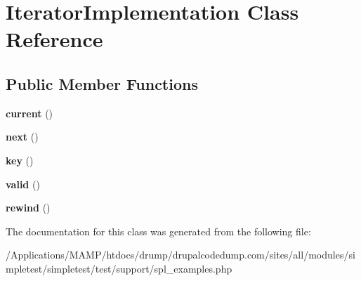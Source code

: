 \hypertarget{class_iterator_implementation}{
\section{IteratorImplementation Class Reference}
\label{class_iterator_implementation}
}
\subsection*{Public Member Functions}
\begin{DoxyCompactItemize}
\item 
\hypertarget{class_iterator_implementation_af3f0ad66ea4a7aa12425f0b9ac02f8a0}{
{\bfseries current} ()}
\label{class_iterator_implementation_af3f0ad66ea4a7aa12425f0b9ac02f8a0}

\item 
\hypertarget{class_iterator_implementation_afeecb34de372f06263606173e9fce558}{
{\bfseries next} ()}
\label{class_iterator_implementation_afeecb34de372f06263606173e9fce558}

\item 
\hypertarget{class_iterator_implementation_a43a7b3b6433284a120011140b2e0605d}{
{\bfseries key} ()}
\label{class_iterator_implementation_a43a7b3b6433284a120011140b2e0605d}

\item 
\hypertarget{class_iterator_implementation_a18282275d174f5998c492802a1fff1b5}{
{\bfseries valid} ()}
\label{class_iterator_implementation_a18282275d174f5998c492802a1fff1b5}

\item 
\hypertarget{class_iterator_implementation_a030617415583ed73f86fa73160e394ed}{
{\bfseries rewind} ()}
\label{class_iterator_implementation_a030617415583ed73f86fa73160e394ed}

\end{DoxyCompactItemize}


The documentation for this class was generated from the following file:\begin{DoxyCompactItemize}
\item 
/Applications/MAMP/htdocs/drump/drupalcodedump.com/sites/all/modules/simpletest/simpletest/test/support/spl\_\-examples.php\end{DoxyCompactItemize}
